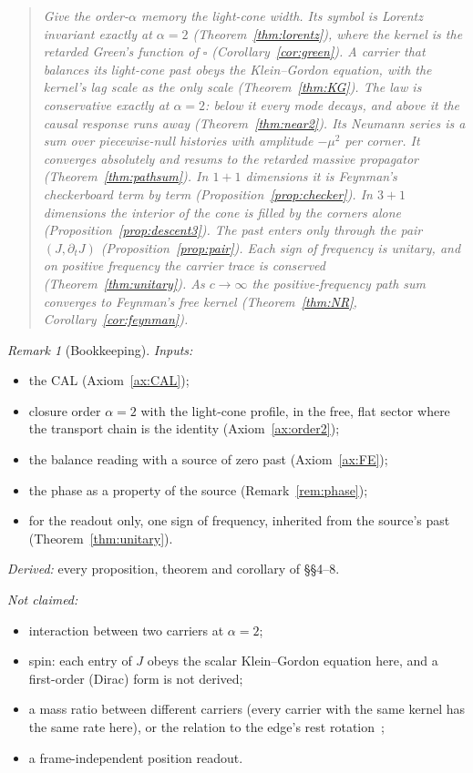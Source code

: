 \documentclass[11pt]{amsart}
\theoremstyle{definition}
\theoremstyle{remark}
\newtheorem{remark}[theorem]{Remark}
\begin{document}
\begin{quote}\itshape
Give the order-$\alpha$ memory the light-cone width. Its symbol is Lorentz invariant exactly at $\alpha=2$ (Theorem~\ref{thm:lorentz}), where the kernel is the retarded Green's function of $\square$ (Corollary~\ref{cor:green}). A carrier that balances its light-cone past obeys the Klein--Gordon equation, with the kernel's lag scale as the only scale (Theorem~\ref{thm:KG}). The law is conservative exactly at $\alpha=2$: below it every mode decays, and above it the causal response runs away (Theorem~\ref{thm:near2}). Its Neumann series is a sum over piecewise-null histories with amplitude $-\mu^2$ per corner. It converges absolutely and resums to the retarded massive propagator (Theorem~\ref{thm:pathsum}). In $1+1$ dimensions it is Feynman's checkerboard term by term (Proposition~\ref{prop:checker}). In $3+1$ dimensions the interior of the cone is filled by the corners alone (Proposition~\ref{prop:descent3}). The past enters only through the pair $(J,\partial_tJ)$ (Proposition~\ref{prop:pair}). Each sign of frequency is unitary, and on positive frequency the carrier trace is conserved (Theorem~\ref{thm:unitary}). As $c\to\infty$ the positive-frequency path sum converges to Feynman's free kernel (Theorem~\ref{thm:NR}, Corollary~\ref{cor:feynman}).
\end{quote}

\begin{remark}[Bookkeeping]\label{rem:ledger}
\emph{Inputs:}
\begin{itemize}
\item the CAL (Axiom~\ref{ax:CAL});
\item closure order $\alpha=2$ with the light-cone profile, in the free, flat sector where the transport chain is the identity (Axiom~\ref{ax:order2});
\item the balance reading with a source of zero past (Axiom~\ref{ax:FE});
\item the phase as a property of the source (Remark~\ref{rem:phase});
\item for the readout only, one sign of frequency, inherited from the source's past (Theorem~\ref{thm:unitary}).
\end{itemize}
\emph{Derived:} every proposition, theorem and corollary of \S\S4--8.

\emph{Not claimed:}
\begin{itemize}
\item interaction between two carriers at $\alpha=2$;
\item spin: each entry of $J$ obeys the scalar Klein--Gordon equation here, and a first-order (Dirac) form is not derived;
\item a mass ratio between different carriers (every carrier with the same kernel has the same rate here), or the relation to the edge's rest rotation~\cite{Edge};
\item a frame-independent position readout.
\end{itemize}
\end{remark}
\end{document}
